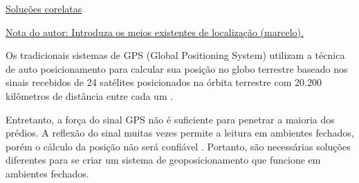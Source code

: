 \documentclass[
	12pt,				%
	openright,			%
	oneside,			%
	a4paper,			%
	chapter=TITLE,		%
	english,			%
	french,				%
	spanish,			%
	brazil				%
	]{abntex2}
\begin{document}
{%








\underline{Soluções corelatas}

\underline{Nota do autor: Introduza os meios existentes de localização (marcelo).}


Os tradicionais sistemas de GPS (Global Positioning System) utilizam a
técnica de auto posicionamento para calcular sua posição no globo terrestre baseado
nos sinais recebidos de 24 satélites posicionados na órbita terrestre com 20.200
kilômetros de distância entre cada um \cite{Djuknic2001}.


Entretanto, a força do sinal GPS não é suficiente para penetrar a maioria dos
prédios. A reflexão do sinal muitas vezes permite a leitura em ambientes
fechados, porém o cálculo da posição não será confiável
\cite{Dartmouth2000}. Portanto, são necessárias soluções diferentes para
se criar um sistema de geoposicionamento que funcione em ambientes fechados.


}
\end{document}
